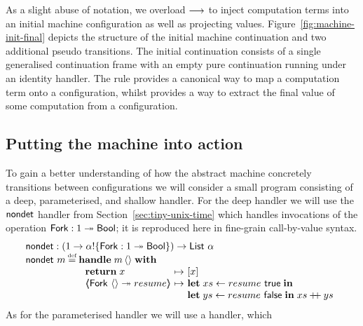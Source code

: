 \documentclass[12pt,phd,lfcs,twoside,openright,logo,leftchapter,normalheadings]{infthesis}
\theoremstyle{plain}
\theoremstyle{definition}
\begin{document}
As a slight abuse of notation, we overload $\longrightarrow$ to inject
computation terms into an initial machine configuration as well as
projecting values. Figure~\ref{fig:machine-init-final} depicts the
structure of the initial machine continuation and two additional
pseudo transitions.  The initial continuation consists of a single
generalised continuation frame with an empty pure continuation running
under an identity handler. The  rule provides a canonical
way to map a computation term onto a configuration, whilst 
provides a way to extract the final value of some computation from a
configuration.

\subsection{Putting the machine into action}
\newcommand{\chiid}{\ensuremath{\chi_{\text{id}}}}
\newcommand{\kappaid}{\ensuremath{\kappa_{\text{id}}}}
\newcommand{\incr}{\dec{incr}}
\newcommand{\Incr}{\dec{Incr}}
\newcommand{\prodf}{\dec{prod}}
\newcommand{\consf}{\dec{cons}}
%
To gain a better understanding of how the abstract machine concretely
transitions between configurations we will consider a small program
consisting of a deep, parameterised, and shallow handler.
%
For the deep handler we will use the $\mathsf{nondet}$ handler from
Section~\ref{sec:tiny-unix-time} which handles invocations of the
operation $\mathsf{Fork} : 1 \twoheadrightarrow \mathsf{Bool}$; it is reproduced here in
fine-grain call-by-value syntax.
%
\[
  \bl
     \nondet : (\UnitType \to \alpha \eff \{\Fork : \UnitType \opto \Bool\}) \to \List~\alpha\\
     \nondet~m \defas \bl
       \Handle\;m\,\Unit\;\With\\
         ~\ba{@{~}l@{~}c@{~}l}
            \Return\;x &\mapsto& [x]\\
            \OpCase{\Fork}{\Unit}{resume} &\mapsto&
              \bl
                \Let\;xs \revto resume~\True\;\In\\
                \Let\;ys \revto resume~\False\;\In\;
                xs \concat ys
              \el
     \ea
     \el
  \el
\]
%
As for the parameterised handler we will use a handler, which
\end{document}
